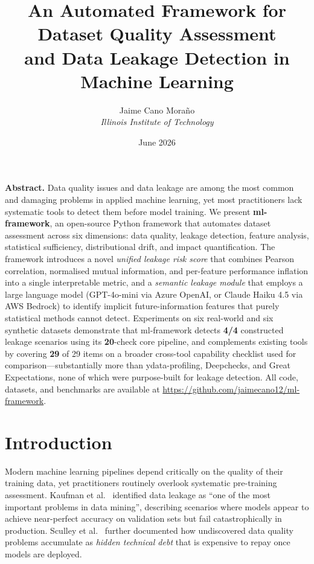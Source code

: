 \documentclass[11pt]{article}
\title{\textbf{An Automated Framework for Dataset Quality Assessment\\
and Data Leakage Detection in Machine Learning}}
\author{
  Jaime Cano Mora\~{n}o\\
  \textit{Illinois Institute of Technology}
}
\date{June 2026}
\begin{document}
\maketitle

\begin{mdframed}[style=abstractbox]
\noindent\textbf{Abstract.}\quad
Data quality issues and data leakage are among the most common and damaging
problems in applied machine learning, yet most practitioners lack systematic
tools to detect them before model training.  We present \textbf{ml-framework},
an open-source Python framework that automates dataset assessment across six
dimensions: data quality, leakage detection, feature analysis, statistical
sufficiency, distributional drift, and impact quantification.  The framework
introduces a novel \emph{unified leakage risk score} that combines Pearson
correlation, normalised mutual information, and per-feature performance
inflation into a single interpretable metric, and a \emph{semantic leakage
module} that employs a large language model (GPT-4o-mini via Azure OpenAI, or
Claude Haiku 4.5 via AWS Bedrock) to identify implicit
future-information features that purely statistical methods cannot detect.
Experiments on six real-world and six synthetic datasets demonstrate that
ml-framework detects \textbf{4/4} constructed leakage scenarios using its
\textbf{20}-check core pipeline, and complements existing tools by covering
\textbf{29} of 29 items on a broader cross-tool capability checklist used for
comparison---substantially more than ydata-profiling, Deepchecks, and Great
Expectations, none of which were purpose-built for leakage detection.  All
code, datasets, and benchmarks are available at
\url{https://github.com/jaimecano12/ml-framework}.
\end{mdframed}

\section{Introduction}
\label{sec:intro}

Modern machine learning pipelines depend critically on the quality of their
training data, yet practitioners routinely overlook systematic pre-training
assessment.  Kaufman et al.~\cite{kaufman2012leakage} identified data leakage
as ``one of the most important problems in data mining'', describing scenarios
where models appear to achieve near-perfect accuracy on validation sets but
fail catastrophically in production.  Sculley et al.~\cite{sculley2015hidden}
further documented how undiscovered data quality problems accumulate as
\emph{hidden technical debt} that is expensive to repay once models are
deployed.
\end{document}
